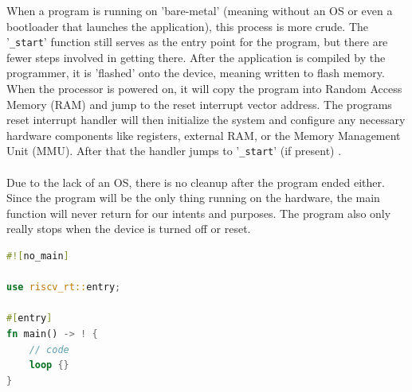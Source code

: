 When a program is running on 'bare-metal' (meaning without an OS or even a bootloader that launches the application), this process is more crude.
The '\lstinline{_start}' function still serves as the entry point for the program, but there are fewer steps involved in getting there.
After the application is compiled by the programmer, it is 'flashed' onto the device, meaning written to flash memory.
When the processor is powered on, it will copy the program into Random Access Memory (RAM) and jump to the reset interrupt vector address.
The programs reset interrupt handler will then initialize the system and configure any necessary hardware components
like registers, external RAM, or the Memory Management Unit (MMU).
After that the handler jumps to '\lstinline{_start}' (if present) \cite{before_main}.\\\\
Due to the lack of an OS, there is no cleanup after the program ended either.
Since the program will be the only thing running on the hardware,
the main function will never return for our intents and purposes.
The program also only really stops when the device is turned off or reset.
\\
\begin{minipage}{\textwidth}
\begin{lstlisting}[style=colorEX,language=Rust,caption={Example main function for the pulp-platform},label={code:embedded_main}]
#![no_main]

use riscv_rt::entry;

#[entry]
fn main() -> ! {
    // code
    loop {}
}
\end{lstlisting}
\end{minipage}

